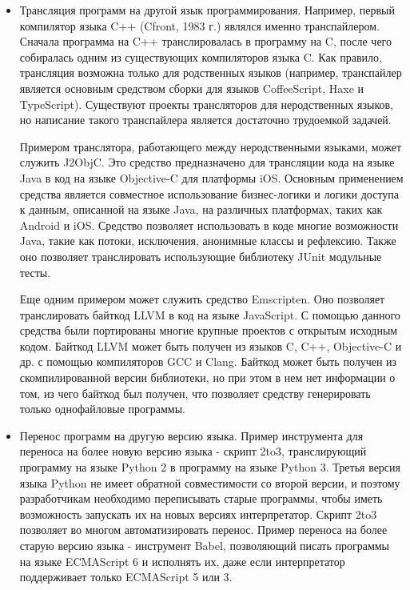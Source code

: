 \begin{itemize}
\item Трансляция программ на другой язык программирования. Например, первый компилятор языка C++ (Cfront, 1983 г.) являлся именно транспайлером. Сначала программа на C++ транслировалась в программу на C, после чего собиралась одним из существующих компиляторов языка C. Как правило, трансляция возможна только для родственных языков (например, транспайлер является основным средством сборки для языков CoffeeScript, Haxe и TypeScript). Существуют проекты трансляторов для неродственных языков, но написание такого транспайлера является достаточно трудоемкой задачей.

Примером транслятора, работающего между неродственными языками, может служить J2ObjC. Это средство предназначено для трансляции кода на языке Java в код на языке Objective-C для платформы iOS. Основным применением средства является совместное использование бизнес-логики и логики доступа к данным, описанной на языке Java, на различных платформах, таких как Android и iOS. Средство позволяет использовать в коде многие возможности Java, такие как потоки, исключения, анонимные классы и рефлексию. Также оно позволяет транслировать использующие библиотеку JUnit модульные тесты.

Еще одним примером может служить средство Emscripten\cite{zakai2011emscripten}. Оно позволяет транслировать байткод LLVM в код на языке JavaScript. С помощью данного средства были портированы многие крупные проектов с открытым исходным кодом. Байткод LLVM может быть получен из языков C, C++, Objective-C и др. с помощью компиляторов GCC и Clang. Байткод может быть получен из скомпилированной версии библиотеки, но при этом в нем нет информации о том, из чего байткод был получен, что позволяет средству генерировать только однофайловые программы.
\item Перенос программ на другую версию языка. Пример инструмента для переноса на более новую версию языка - скрипт 2to3, транслирующий программу на языке Python 2 в программу на языке Python 3. Третья версия языка Python не имеет обратной совместимости со второй версии, и поэтому разработчикам необходимо переписывать старые программы, чтобы иметь возможность запускать их на новых версиях интерпретатор. Скрипт 2to3 позволяет во многом автоматизировать перенос. Пример переноса на более старую версию языка - инструмент Babel, позволяющий писать программы на языке ECMAScript 6 и исполнять их, даже если интерпретатор поддерживает только ECMAScript 5 или 3.
\end{itemize}

